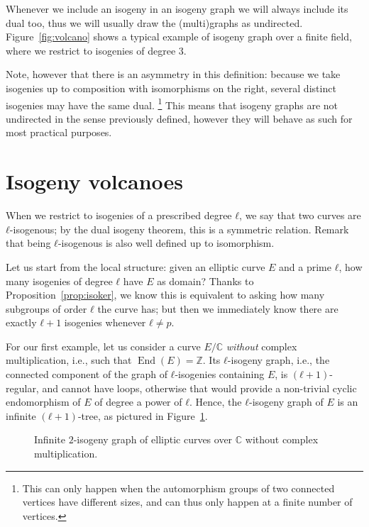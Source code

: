 \documentclass[10pt]{article}
\theoremstyle{plain}
\theoremstyle{definition}
\DeclareMathOperator{\End}{End} %
\begin{document}
Whenever we include an isogeny in an isogeny graph we will always
include its dual too, thus we will usually draw the (multi)graphs as
undirected. %
Figure~\ref{fig:volcano} shows a typical example of isogeny graph over
a finite field, where we restrict to isogenies of degree $3$. %

Note, however that there is an asymmetry in this definition: because
we take isogenies up to composition with isomorphisms on the right,
several distinct isogenies may have the same dual.%
\footnote{This can only happen when the automorphism groups of two
  connected vertices have different sizes, and can thus only happen at
  a finite number of vertices.} %
This means that isogeny graphs are not undirected in the sense
previously defined, however they will behave as such for most
practical purposes. %


\section{Isogeny volcanoes}
\label{sec:ell-isogeny-graphs}

When we restrict to isogenies of a prescribed degree $ℓ$, we say that
two curves are $ℓ$-isogenous; by the dual isogeny theorem, this is a
symmetric relation. %
Remark that being $ℓ$-isogenous is also well defined up to
isomorphism.

Let us start from the local structure: given an elliptic curve $E$ and
a prime $ℓ$, how many isogenies of degree $ℓ$ have $E$ as domain? %
Thanks to Proposition~\ref{prop:isoker}, we know this is equivalent to
asking how many subgroups of order $ℓ$ the curve has; but then we
immediately know there are exactly $ℓ+1$ isogenies whenever $ℓ≠p$.

For our first example, let us consider a curve $E/ℂ$ \emph{without}
complex multiplication, i.e., such that $\End(E)=ℤ$.  %
Its $ℓ$-isogeny graph, i.e., the connected component of the graph of
$ℓ$-isogenies containing $E$, is $(ℓ+1)$-regular, and cannot have
loops, otherwise that would provide a non-trivial cyclic endomorphism of $E$
of degree a power of $ℓ$. %
Hence, the $ℓ$-isogeny graph of $E$ is an infinite $(ℓ+1)$-tree, as
pictured in Figure~\ref{fig:infinite-tree}. %

\begin{figure}
  \centering
  
    \caption{Infinite $2$-isogeny graph of elliptic curves over $ℂ$
      without complex multiplication.}
  \label{fig:infinite-tree}
\end{figure}
\end{document}
